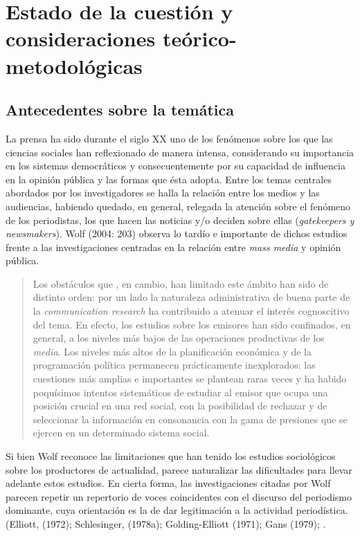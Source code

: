 \chapter{Estado de la cuestión y consideraciones teórico-metodológicas}

\section{Antecedentes sobre la temática}

La prensa ha sido durante el siglo XX uno de los fenómenos sobre los que las ciencias sociales han reflexionado de manera intensa, considerando su importancia en los sistemas democráticos y consecuentemente por su capacidad de influencia en la opinión pública y las formas que ésta adopta. Entre los temas centrales abordados por los investigadores se halla la relación entre los medios y las audiencias, habiendo quedado, en general, relegada la atención sobre el fenómeno de los periodistas, los que hacen las noticias y/o deciden sobre ellas (\emph{gatekeepers y newsmakers}). Wolf (2004: 203) observa lo tardío e importante de dichos estudios frente a las investigaciones centradas en la relación entre \emph{mass media} y opinión pública.

\begin{quote}
	Los obstáculos que , en cambio, han limitado este ámbito han sido de distinto orden: por un lado la naturaleza administrativa de buena parte de la \emph{communication research} ha contribuido a atenuar el interés cognoscitivo del tema. En efecto, los estudios sobre los emisores han sido confinados, en general, a los niveles más bajos de las operaciones productivas de los \emph{media}. Los niveles más altos de la planificación económica y de la programación política permanecen prácticamente inexplorados: las cuestiones más amplias e importantes se plantean raras veces y ha habido poquísimos intentos sistemáticos de estudiar al emisor que ocupa una posición crucial en una red social, con la posibilidad de rechazar y de seleccionar la información en consonancia con la gama de presiones que se ejercen en un determinado sistema social.
\end{quote}


Si bien Wolf reconoce las limitaciones que han tenido los estudios sociológicos sobre los productores de actualidad, parece naturalizar las dificultades para llevar adelante estos estudios. En cierta forma, las investigaciones citadas por Wolf parecen repetir un repertorio de voces coincidentes con el discurso del periodismo dominante, cuya orientación es la de dar legitimación a la actividad periodística. (Elliott, (1972); Schlesinger, (1978a); Golding-Elliott (1971); Gans (1979); \textcite {@6961-ALTHEIDE1976}.

